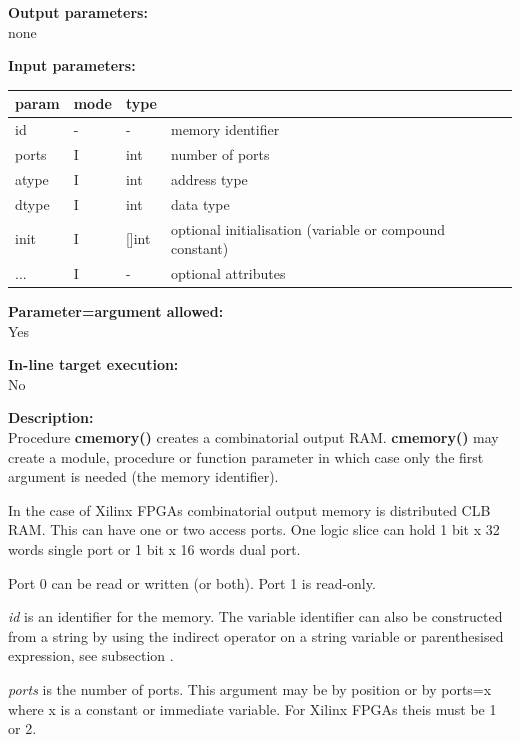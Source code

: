         {\bf Output parameters:} \\
        none
        
        {\bf Input parameters:} \\
        \begin{tabular}{| l | l | l | l |}
        \hline
        param  & mode       & type  & \\
        \hline \hline
        id     & -  &  -    & memory identifier         \\ \hline
        ports  & I  & int   & number of ports           \\ \hline
        atype  & I  & int   & address type              \\ \hline
        dtype  & I  & int   & data type                 \\ \hline
        init   & I  & []int & optional initialisation (variable or compound
                              constant)                 \\ \hline
        ...    & I  &  -    & optional attributes       \\ \hline
        \end{tabular}
        
        {\bf Parameter=argument allowed:} \\
        Yes
        
        {\bf In-line target execution:} \\
        No
        
        {\bf Description:} \\
        Procedure {\bf cmemory()} creates a combinatorial output RAM.        
        {\bf cmemory()} may create a module, procedure or function
        parameter in which case only the first argument is needed (the memory
        identifier).

        In the case of Xilinx FPGAs combinatorial output memory is
        distributed CLB RAM. This can have one or two access ports. One
        logic slice can hold 1 bit x 32 words single port or 1 bit x 16
        words dual port.

        Port 0 can be read or written (or both). Port 1 is read-only.
        
        {\em id} is an identifier for the memory. The variable identifier can
        also be constructed from a string by using the indirect operator on a
        string variable or parenthesised expression, see subsection
        .

        {\em ports} is the number of ports. This argument may be by position or
        by ports=x where x is a constant or immediate variable. For Xilinx FPGAs
        theis must be 1 or 2.

